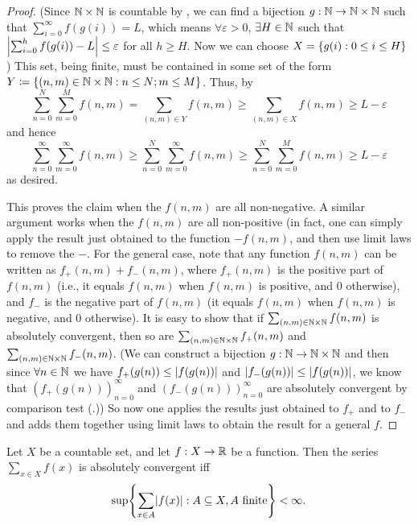 \begin{proof}
  (Since \(\mathbb{N} \times \mathbb{N}\) is countable by , we can find a bijection \(g : \mathbb{N} \to \mathbb{N} \times \mathbb{N}\) such that \(\sum_{i = 0}^\infty f(g(i)) = L\), which means \(\forall \varepsilon > 0\), \(\exists H \in \mathbb{N}\) such that \(\left\lvert\sum_{i = 0}^h f(g(i)) - L\right\rvert \leq \varepsilon\) for all \(h \geq H\).
  Now we can choose \(X = \left\lbrace g(i) : 0 \leq i \leq H\right\rbrace\))
  This set, being finite, must be contained in some set of the form \(Y \coloneqq \left\lbrace(n,m) \in \mathbb{N} \times \mathbb{N} : n \leq N; m \leq M \right\rbrace\).
  Thus, by 
  \[
    \sum_{n = 0}^N \sum_{m = 0}^M f(n, m) = \sum_{(n, m) \in Y} f(n, m) \geq \sum_{(n, m) \in X} f(n, m) \geq L - \varepsilon
  \]
  and hence
  \[
    \sum_{n = 0}^\infty \sum_{m = 0}^\infty f(n, m) \geq \sum_{n = 0}^N \sum_{m = 0}^\infty f(n, m) \geq \sum_{n = 0}^N \sum_{m = 0}^M f(n, m) \geq L - \varepsilon
  \]
  as desired.

  This proves the claim when the \(f(n, m)\) are all non-negative.
  A similar argument works when the \(f(n, m)\) are all non-positive
  (in fact, one can simply apply the result just obtained to the function \(-f(n, m)\), and then use limit laws to remove the \(-\).
  For the general case, note that any function \(f(n, m)\) can be written as \(f_+(n, m) + f_-(n, m)\), where \(f_+(n, m)\) is the positive part of \(f(n, m)\)
  (i.e., it equals \(f(n, m)\) when \(f(n, m)\) is positive, and \(0\) otherwise),
  and \(f_-\) is the negative part of \(f(n, m)\)
  (it equals \(f(n, m)\) when \(f(n, m)\) is negative, and \(0\) otherwise).
  It is easy to show that if \(\sum_{(n, m) \in \mathbb{N} \times \mathbb{N}} f(n, m)\) is absolutely convergent, then so are \(\sum_{(n, m) \in \mathbb{N} \times \mathbb{N}} f_+(n, m)\) and \(\sum_{(n, m) \in \mathbb{N} \times \mathbb{N}} f_-(n, m)\).
  (We can construct a bijection \(g : \mathbb{N} \to \mathbb{N} \times \mathbb{N}\) and then since \(\forall n \in \mathbb{N}\) we have \(f_+(g(n)) \leq \left\lvert f(g(n))\right\rvert\) and \(\left\lvert f_-(g(n))\right\rvert \leq \left\lvert f(g(n))\right\rvert\), we know that \((f_+(g(n)))_{n = 0}^\infty\) and \((f_-(g(n)))_{n = 0}^\infty\) are absolutely convergent by comparison test (.))
  So now one applies the results just obtained to \(f_+\) and to \(f_-\) and adds them together using limit laws to obtain the result for a general \(f\).
\end{proof}

\begin{lem}\label{i:8.2.3}
  Let \(X\) be a countable set, and let \(f : X \to \mathbb{R}\) be a function.
  Then the series \(\sum_{x \in X} f(x)\) is absolutely convergent iff
  \[
    \sup\set{\sum_{x \in A} \abs{f(x)} : A \subseteq X, A \text{ finite}} < \infty.
  \]
\end{lem}

